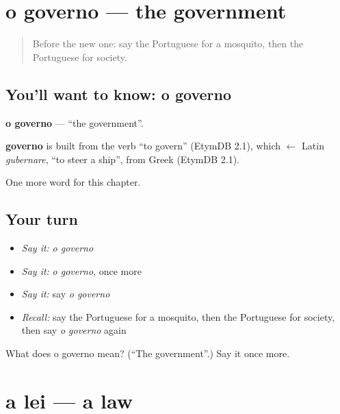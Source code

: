 \section[o governo]{o governo — the government}

\label{lesson:PT-C158-governo}



\begin{quote}
Before the new one: say the Portuguese for a mosquito, then the Portuguese for society.
\end{quote}

\subsection*{You'll want to know: o governo}
\textbf{o governo} — \textquotedblleft{}the government\textquotedblright{}.

\begin{cousinweb}
\textbf{governo} is built from the verb \textquotedblleft{}to govern\textquotedblright{} (EtymDB 2.1), which $\leftarrow$ Latin \emph{gubernare}, \textquotedblleft{}to steer a ship\textquotedblright{}, from Greek (EtymDB 2.1).
\end{cousinweb}

\begin{grammarlens}[title={What you've built}]
One more word for this chapter.
\end{grammarlens}

\subsection*{Your turn}
\begin{itemize}
\raggedright
  \item \emph{Say it:} \emph{o governo}
  \item \emph{Say it:} \emph{o governo}, once more
  \item \emph{Say it:} say \emph{o governo}
  \item \emph{Recall:} say the Portuguese for a mosquito, then the Portuguese for society, then say \emph{o governo} again
\end{itemize}

\begin{tcolorbox}[breakable,colback=teal!4,colframe=teal!35!black,title={Before you move on}]
What does o governo mean? (\textquotedblleft{}The government\textquotedblright{}.) Say it once more.
\end{tcolorbox}
\section[a lei]{a lei — a law}

